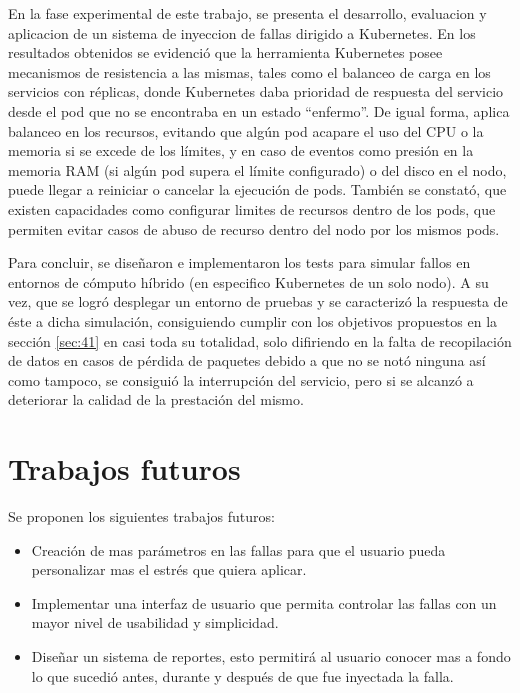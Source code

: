 \par En la fase experimental de este trabajo, se presenta el desarrollo, evaluacion y aplicacion de un sistema de inyeccion de fallas dirigido a Kubernetes. En los resultados obtenidos se evidenció que la herramienta Kubernetes posee mecanismos de resistencia a las mismas, tales como el balanceo de carga en los servicios con réplicas, donde Kubernetes daba prioridad de respuesta del servicio desde el pod que no se encontraba en un estado ``enfermo''. De igual forma, aplica balanceo en los recursos, evitando que algún pod acapare el uso del CPU o la memoria si se excede de los límites, y en caso de eventos como presión en la memoria RAM (si algún pod supera el límite configurado) o del disco en el nodo, puede llegar a reiniciar o cancelar la ejecución de pods. También se constató, que existen capacidades como configurar limites de recursos dentro de los pods, que permiten evitar casos de abuso de recurso dentro del nodo por los mismos pods.\\

\par Para concluir, se diseñaron e implementaron los tests para simular fallos en entornos de cómputo híbrido (en especifico Kubernetes de un solo nodo). A su vez, que se logró desplegar un entorno de pruebas y se caracterizó la respuesta de éste a dicha simulación, consiguiendo cumplir con los objetivos propuestos en la sección \ref{sec:41} en casi toda su totalidad, solo difiriendo en la falta de recopilación de datos en casos de pérdida de paquetes debido a que no se notó ninguna así como tampoco, se consiguió la interrupción del servicio, pero si se alcanzó a deteriorar la calidad de la prestación del mismo.


\section{Trabajos futuros}
\par Se proponen los siguientes trabajos futuros:

\begin{itemize}
\item Creación de mas parámetros en las fallas para que el usuario pueda personalizar mas el estrés que quiera aplicar.
\item Implementar una interfaz de usuario que permita controlar las fallas con un mayor nivel de usabilidad y simplicidad.
\item Diseñar un sistema de reportes, esto permitirá al usuario conocer mas a fondo lo que sucedió antes, durante y después de que fue inyectada la falla.
\end{itemize}

